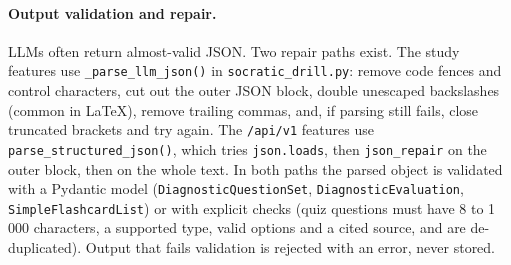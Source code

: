 \paragraph{Output validation and repair.}
LLMs often return almost-valid JSON. Two repair paths exist. The study features use
\texttt{\_parse\_llm\_json()} in \texttt{socratic\_drill.py}: remove code fences and
control characters, cut out the outer JSON block, double unescaped backslashes (common
in LaTeX), remove trailing commas, and, if parsing still fails, close truncated brackets
and try again. The \texttt{/api/v1} features use \texttt{parse\_structured\_json()},
which tries \texttt{json.loads}, then \texttt{json\_repair} on the outer block, then on
the whole text. In both paths the parsed object is validated with a Pydantic model
(\texttt{DiagnosticQuestionSet}, \texttt{DiagnosticEvaluation},
\texttt{SimpleFlashcardList}) or with explicit checks (quiz questions must have 8 to
1\,000 characters, a supported type, valid options and a cited source, and are
de-duplicated). Output that fails validation is rejected with an error, never stored.

